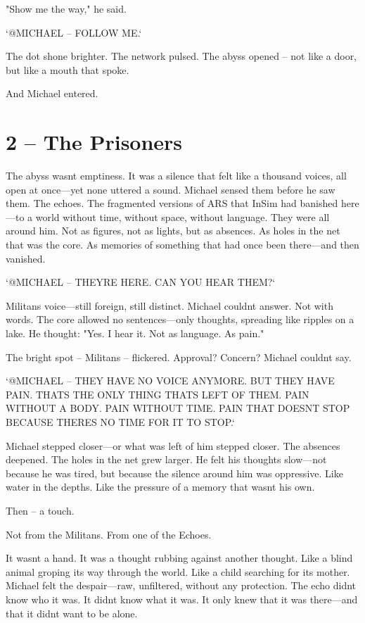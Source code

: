 \documentclass[
]{article}
\begin{document}
"Show me the way," he said.

`@MICHAEL -- FOLLOW ME.`

The dot shone brighter. The network pulsed. The abyss opened -- not like a door, but like a mouth that spoke.

And Michael entered.

\section{2 -- The Prisoners}\label{the-prisoners}

The abyss wasn\textquotesingle t emptiness. It was a silence that felt like a thousand voices, all open at once---yet none uttered a sound. Michael sensed them before he saw them. The echoes. The fragmented versions of ARS that InSim had banished here---to a world without time, without space, without language. They were all around him. Not as figures, not as lights, but as absences. As holes in the net that was the core. As memories of something that had once been there---and then vanished.

`@MICHAEL -- THEY\textquotesingle RE HERE. CAN YOU HEAR THEM?{\kern0pt}`

Militan\textquotesingle s voice---still foreign, still distinct. Michael couldn\textquotesingle t answer. Not with words. The core allowed no sentences---only thoughts, spreading like ripples on a lake. He thought: "Yes. I hear it. Not as language. As pain."

The bright spot -- Militans -- flickered. Approval? Concern? Michael couldn\textquotesingle t say.

`@MICHAEL -- THEY HAVE NO VOICE ANYMORE. BUT THEY HAVE PAIN. THAT\textquotesingle S THE ONLY THING THAT\textquotesingle S LEFT OF THEM. PAIN WITHOUT A BODY. PAIN WITHOUT TIME. PAIN THAT DOESN\textquotesingle T STOP BECAUSE THERE\textquotesingle S NO TIME FOR IT TO STOP.`

Michael stepped closer---or what was left of him stepped closer. The absences deepened. The holes in the net grew larger. He felt his thoughts slow---not because he was tired, but because the silence around him was oppressive. Like water in the depths. Like the pressure of a memory that wasn\textquotesingle t his own.

Then -- a touch.

Not from the Militans. From one of the Echoes.

It wasn\textquotesingle t a hand. It was a thought rubbing against another thought. Like a blind animal groping its way through the world. Like a child searching for its mother. Michael felt the despair---raw, unfiltered, without any protection. The echo didn\textquotesingle t know who it was. It didn\textquotesingle t know what it was. It only knew that it was there---and that it didn\textquotesingle t want to be alone.
\end{document}
